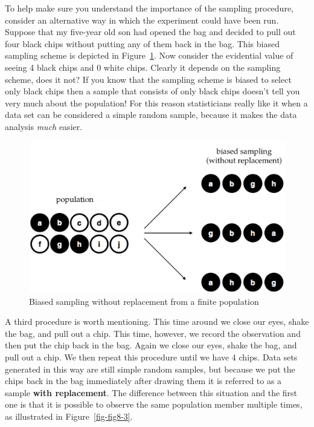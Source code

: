 \documentclass[
  a4paper,
]{book}
\begin{document}
To help make sure you understand the importance of the sampling
procedure, consider an alternative way in which the experiment could
have been run. Suppose that my five-year old son had opened the bag and
decided to pull out four black chips without putting any of them back in
the bag. This biased sampling scheme is depicted in
Figure~\ref{fig-fig8-2}. Now consider the evidential value of seeing 4
black chips and 0 white chips. Clearly it depends on the sampling
scheme, does it not? If you know that the sampling scheme is biased to
select only black chips then a sample that consists of only black chips
doesn't tell you very much about the population! For this reason
statisticians really like it when a data set can be considered a simple
random sample, because it makes the data analysis \emph{much} easier.

\begin{figure}

\includegraphics[width=1\textwidth,height=\textheight]{images/fig8-2.png} \hfill{}

\caption{\label{fig-fig8-2}Biased sampling without replacement from a
finite population}

\end{figure}

A third procedure is worth mentioning. This time around we close our
eyes, shake the bag, and pull out a chip. This time, however, we record
the observation and then put the chip back in the bag. Again we close
our eyes, shake the bag, and pull out a chip. We then repeat this
procedure until we have 4 chips. Data sets generated in this way are
still simple random samples, but because we put the chips back in the
bag immediately after drawing them it is referred to as a sample
\textbf{with replacement}. The difference between this situation and the
first one is that it is possible to observe the same population member
multiple times, as illustrated in Figure~\ref{fig-fig8-3}.
\end{document}
